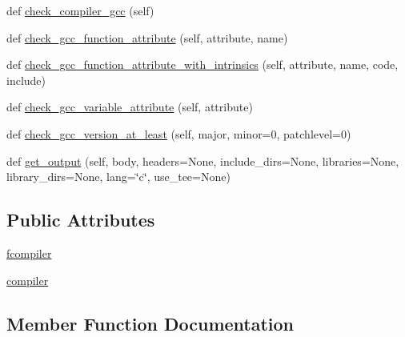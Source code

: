 \begin{DoxyCompactItemize}
\item 
def \hyperlink{classnumpy_1_1distutils_1_1command_1_1config_1_1config_a143b618cecd97c106d87bf50ddd5bd4a}{check\+\_\+compiler\+\_\+gcc} (self)
\item 
def \hyperlink{classnumpy_1_1distutils_1_1command_1_1config_1_1config_ae0c5031e98e740f8afe22360fd525a0f}{check\+\_\+gcc\+\_\+function\+\_\+attribute} (self, attribute, name)
\item 
def \hyperlink{classnumpy_1_1distutils_1_1command_1_1config_1_1config_abcb6bb5fb63a22b8dc39d42df537be7b}{check\+\_\+gcc\+\_\+function\+\_\+attribute\+\_\+with\+\_\+intrinsics} (self, attribute, name, code, include)
\item 
def \hyperlink{classnumpy_1_1distutils_1_1command_1_1config_1_1config_a6637166ced9256f28fca013f35449462}{check\+\_\+gcc\+\_\+variable\+\_\+attribute} (self, attribute)
\item 
def \hyperlink{classnumpy_1_1distutils_1_1command_1_1config_1_1config_ae24f4e6dffa9f1e57b09b1b1118ba1ff}{check\+\_\+gcc\+\_\+version\+\_\+at\+\_\+least} (self, major, minor=0, patchlevel=0)
\item 
def \hyperlink{classnumpy_1_1distutils_1_1command_1_1config_1_1config_a00e019e0e3dd16d936699a4d46066203}{get\+\_\+output} (self, body, headers=None, include\+\_\+dirs=None, libraries=None, library\+\_\+dirs=None, lang=\char`\"{}c\char`\"{}, use\+\_\+tee=None)
\end{DoxyCompactItemize}
\subsection*{Public Attributes}
\begin{DoxyCompactItemize}
\item 
\hyperlink{classnumpy_1_1distutils_1_1command_1_1config_1_1config_a1827bbda2b6266dba5f9c7f3918b5f9f}{fcompiler}
\item 
\hyperlink{classnumpy_1_1distutils_1_1command_1_1config_1_1config_a389a6278748e970bc0385ebfd70e93bb}{compiler}
\end{DoxyCompactItemize}


\subsection{Member Function Documentation}
\mbox{\label{classnumpy_1_1distutils_1_1command_1_1config_1_1config_a143b618cecd97c106d87bf50ddd5bd4a}} 
